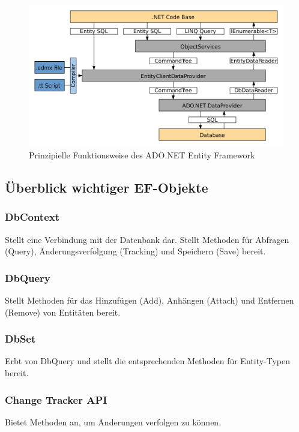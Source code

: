 \begin{figure}[h]
    \begin{center}
        \includegraphics*[width=15cm]{pics/ADO_NET_EF.png}
        \caption[Prinzipielle Funktionsweise des ADO.NET Entity Framework]{Prinzipielle Funktionsweise des ADO.NET Entity Framework \cite{AdoNetArchitecturePic}}
    \end{center}
\end{figure}

\subsection{Überblick wichtiger EF-Objekte}
\subsubsection{DbContext}
Stellt eine Verbindung mit der Datenbank dar. Stellt Methoden für Abfragen (Query),
Änderungsverfolgung (Tracking) und Speichern (Save) bereit.

\subsubsection{DbQuery}
Stellt Methoden für das Hinzufügen (Add), Anhängen (Attach) und Entfernen (Remove) von
Entitäten bereit.

\subsubsection{DbSet}
Erbt von DbQuery und stellt die entsprechenden Methoden für Entity-Typen bereit.

\subsubsection{Change Tracker API}
Bietet Methoden an, um Änderungen verfolgen zu können.

